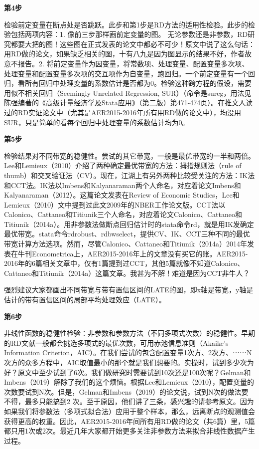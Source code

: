 \documentclass[cn,12pt,math=newtx,citestyle=gb7714-2015,bibstyle=gb7714-2015]{elegantbook}
\begin{document}
	\textbf{第4步}
	
	检验前定变量在断点处是否跳跃。此步和第1步是RD方法的适用性检验。此步的检验包括两项内容：1. 像前三步那样画前定变量的图。 无论参数还是非参数，RD研究都要大把的图！这些图在正式发表的论文中都必不可少！原文中说了这么句话：用RD做的论文，如果缺乏相关的图，十有八九是因为图显示的结果不好，作者故意不报告。2. 将前定变量作为因变量，将常数项、处理变量、配置变量多次项、处理变量和配置变量多次项的交互项作为自变量，跑回归。一个前定变量有一个回归，看所有回归中处理变量的系数估计是否都为0。检验这种跨方程的假设，需要用似不相关回归（Seemingly Unrelated Regression, SUR）（命令是sureg，用法见陈强编著的《高级计量经济学及Stata应用》（第二版）第471-474页）。在推文人读过的RD实证论文中（尤其是AER2015-2016年所有用RD做的论文中），均没用SUR，只是简单的看每个回归中处理变量的系数估计均为0。
	
	\textbf{第5步}
	
	检验结果对不同带宽的稳健性。尝试的其它带宽，一般是最优带宽的一半和两倍。Lee和Lemieux（2010）介绍了两种确定最优带宽的方法：拇指规则法（rule of thumb）和交叉验证法（CV）。现在，江湖上有另外两种比较受关注的方法：IK法和CCT法。IK法以Imbens和Kalyanaraman两个人命名，对应着论文Imbens和Kalyanaraman（2012）。这篇论文发表在Review of Economic Studies，Lee和Lemieux（2010）文中提到过此文2009年的NBER工作论文版。CCT法以Calonico、Cattaneo和Titiunik三个人命名，对应着论文Calonico、Cattaneo和Titiunik（2014a）。用非参数法做断点回归估计时的stata命令rd，就是用IK发确定最优带宽。stata命令rdrobust、rdbwselect，提供CV、IK、CCT三种不同的最优带宽计算方法选项。然而，尽管Calonico、Cattaneo和Titiunik（2014a）2014年发表在牛刊Econometrica上，AER2015-2016年上的文章没有买它的账。AER2015-2016年的6篇相关文章中，仅有1篇提到过CCT，其他5篇就像不知道Calonico、Cattaneo和Titiunik（2014a）这篇文章。我甚为不解！难道是因为CCT非牛人？
	
	强烈建议大家都画出不同带宽与带有置信区间的LATE的图，即x轴是带宽，y轴是估计的带有置信区间的局部平均处理效应（LATE）。
	
	
		\textbf{第6步}
	
	非线性函数的稳健性检验：非参数和参数方法（不同多项式次数）的稳健性。早期的RD文献一般都会挑选多项式的最优次数，可用赤池信息准则（Akaike's Information Criterion，AIC）。在我们尝试的包含配置变量1次方、2次方、⋯⋯N次方的众多方程中，AIC取值最小的那个就是我们想要的。实操时，试到多少次为好？原文中至少试到了6次。我们做研究时需要试到10次还是100次呢？Gelman和Imbens（2019）解除了我们的这个烦恼。根据Lee和Lemieux（2010），配置变量的次数要试到N次。但是，Gelman和Imbens（2019）的论文说，试到N次的做法要不得，最多只能搞到2 次。至于原因，他们讲了三条，感兴趣的请参考原文。因为如果我们将参数法（多项式拟合法）应用于整个样本，那么，远离断点的观测值会获得更高的权重。因此，AER2015-2016年间所有用RD做的论文（共6篇）里，5篇都只用1次或2次。最近几年大家都开始更多关注非参数方法来拟合非线性数据产生过程。
	
\end{document}

